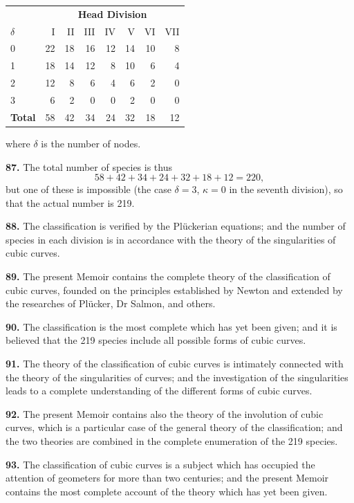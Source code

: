 \documentclass[11pt,a4paper]{article}
\theoremstyle{plain}
\theoremstyle{definition}
\begin{document}
\begin{center}
\small
\begin{tabular}{@{}lrrrrrrr@{}}
\toprule
& \multicolumn{7}{c}{\textbf{Head Division}} \\
$\delta$ & I & II & III & IV & V & VI & VII \\
\midrule
0 & 22 & 18 & 16 & 12 & 14 & 10 & 8 \\
1 & 18 & 14 & 12 & 8 & 10 & 6 & 4 \\
2 & 12 & 8 & 6 & 4 & 6 & 2 & 0 \\
3 & 6 & 2 & 0 & 0 & 2 & 0 & 0 \\
\midrule
\textbf{Total} & 58 & 42 & 34 & 24 & 32 & 18 & 12 \\
\bottomrule
\end{tabular}
\end{center}
where $\delta$ is the number of nodes.

\textbf{87.} The total number of species is thus
\[
58 + 42 + 34 + 24 + 32 + 18 + 12 = 220,
\]
but one of these is impossible (the case $\delta = 3$, $\kappa = 0$ in the seventh division), so that the actual number is 219.

\textbf{88.} The classification is verified by the Pl\"{u}ckerian equations; and the number of species in each division is in accordance with the theory of the singularities of cubic curves.

\textbf{89.} The present Memoir contains the complete theory of the classification of cubic curves, founded on the principles established by Newton and extended by the researches of Pl\"{u}cker, Dr Salmon, and others.

\textbf{90.} The classification is the most complete which has yet been given; and it is believed that the 219 species include all possible forms of cubic curves.

\textbf{91.} The theory of the classification of cubic curves is intimately connected with the theory of the singularities of curves; and the investigation of the singularities leads to a complete understanding of the different forms of cubic curves.

\textbf{92.} The present Memoir contains also the theory of the involution of cubic curves, which is a particular case of the general theory of the classification; and the two theories are combined in the complete enumeration of the 219 species.

\textbf{93.} The classification of cubic curves is a subject which has occupied the attention of geometers for more than two centuries; and the present Memoir contains the most complete account of the theory which has yet been given.
\end{document}
